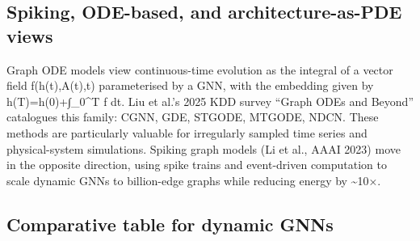 \subsection{Spiking, ODE-based, and architecture-as-PDE views}\label{spiking-ode-based-and-architecture-as-pde-views}

Graph ODE models view continuous-time evolution as the integral of a vector field f(h(t),A(t),t) parameterised by a GNN, with the embedding given by h(T)=h(0)+∫\_0\^{}T f dt. Liu et al.'s 2025 KDD survey ``Graph ODEs and Beyond'' catalogues this family: CGNN, GDE, STGODE, MTGODE, NDCN. These methods are particularly valuable for irregularly sampled time series and physical-system simulations. Spiking graph models (Li et al., AAAI 2023) move in the opposite direction, using spike trains and event-driven computation to scale dynamic GNNs to billion-edge graphs while reducing energy by \textasciitilde10×.

\subsection{Comparative table for dynamic GNNs}\label{comparative-table-for-dynamic-gnns}

